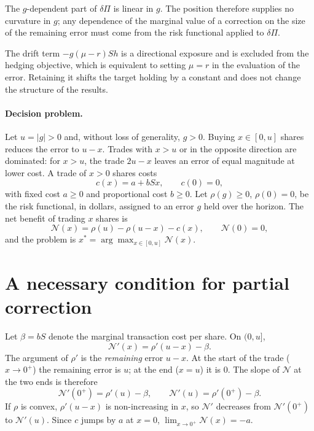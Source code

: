 \documentclass[11pt,a4paper]{article}
\theoremstyle{remark}
\newcommand{\NB}{\mathcal{N}}
\begin{document}
The $g$-dependent part of $\delta\Pi$ is linear in $g$. The position therefore supplies no
curvature in $g$; any dependence of the marginal value of a correction on the size of the
remaining error must come from the risk functional applied to $\delta\Pi$.

The drift term $-g(\mu-r)Sh$ is a directional exposure and is excluded from the hedging
objective, which is equivalent to setting $\mu = r$ in the evaluation of the error.
Retaining it shifts the target holding by a constant and does not change the structure of
the results.

\paragraph{Decision problem.} Let $u = |g| > 0$ and, without loss of generality, $g>0$.
Buying $x\in[0,u]$ shares reduces the error to $u-x$. Trades with $x>u$ or in the opposite
direction are dominated: for $x>u$, the trade $2u-x$ leaves an error of equal magnitude at
lower cost. A trade of $x>0$ shares costs
\begin{equation}
  c(x) = a + bSx , \qquad c(0) = 0,
\end{equation}
with fixed cost $a\ge 0$ and proportional cost $b\ge 0$. Let $\rho(g)\ge 0$, $\rho(0)=0$, be
the risk functional, in dollars, assigned to an error $g$ held over the horizon. The net
benefit of trading $x$ shares is
\begin{equation}
  \NB(x) = \rho(u) - \rho(u - x) - c(x), \qquad \NB(0) = 0,
  \label{eq:net}
\end{equation}
and the problem is $x^* = \arg\max_{x\in[0,u]}\NB(x)$.

\section{A necessary condition for partial correction}\label{sec:lemma}

Let $\beta = bS$ denote the marginal transaction cost per share. On $(0,u]$,
\begin{equation}
  \NB'(x) = \rho'(u - x) - \beta .
\end{equation}
The argument of $\rho'$ is the \emph{remaining} error $u - x$. At the start of the trade
($x\to 0^+$) the remaining error is $u$; at the end ($x = u$) it is $0$. The slope of $\NB$
at the two ends is therefore
\begin{equation}
  \NB'(0^+) = \rho'(u) - \beta, \qquad \NB'(u) = \rho'(0^+) - \beta .
  \label{eq:endslopes}
\end{equation}
If $\rho$ is convex, $\rho'(u-x)$ is non-increasing in $x$, so $\NB'$ decreases from
$\NB'(0^+)$ to $\NB'(u)$. Since $c$ jumps by $a$ at $x=0$, $\lim_{x\to0^+}\NB(x) = -a$.
\end{document}
